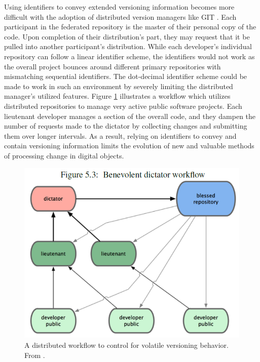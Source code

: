 Using identifiers to convey extended versioning information becomes more difficult with the adoption of distributed version managers like GIT \cite{cederqvist2002version}.
Each participant in the federated repository is the master of their personal copy of the code.
Upon completion of their distribution's part, they may request that it be pulled into another participant's distribution.
While each developer's individual repository can follow a linear identifier scheme, the identifiers would not work as the overall project bounces around different primary repositories with mismatching sequential identifiers.
The dot-decimal identifier scheme could be made to work in such an environment by severely limiting the distributed manager's utilized features.
Figure \ref{fig:federated} illustrates a workflow which utilizes distributed repositories to manage very active public software projects.
Each lieutenant developer manages a section of the overall code, and they dampen the number of requests made to the dictator by collecting changes and submitting them over longer intervals.
As a result, relying on identifiers to convey and contain versioning information limits the evolution of new and valuable methods of processing change in digital objects.

\begin{figure}
	\centering
	\includegraphics[scale=0.85]{figures/federatedGit.png}
	\caption[A distributed workflow to control for volatile versioning behavior.]{A distributed workflow to control for volatile versioning behavior.  From  \cite{cederqvist2002version}.}
	\label{fig:federated}
\end{figure}

